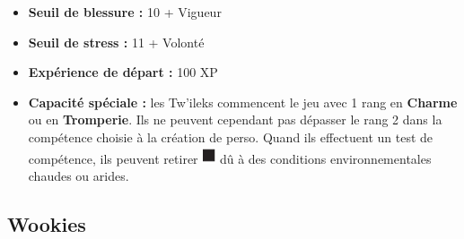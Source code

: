 \documentclass[twoside]{article}
\begin{document}
\begin{minipage}{0.7\textwidth}\raggedleft
	\begin{itemize}
		\item \textbf{Seuil de blessure :} 10 + Vigueur 
		\item \textbf{Seuil de stress :} 11 + Volonté 
		\item \textbf{Expérience de départ :} 100 XP
		\item \textbf{Capacité spéciale :} les Tw'ileks commencent le jeu avec 1 rang en \textbf{Charme} ou en \textbf{Tromperie}. Ils ne peuvent cependant pas dépasser le rang 2 dans la compétence choisie à la création de perso. Quand ils effectuent un test de compétence, ils peuvent retirer {\Large \includegraphics[height=\fontcharht\font`\B]{../_img/dice_black}} dû à des conditions environnementales chaudes ou arides.
	\end{itemize}
\end{minipage}

\subsection*{Wookies}
\end{document}
